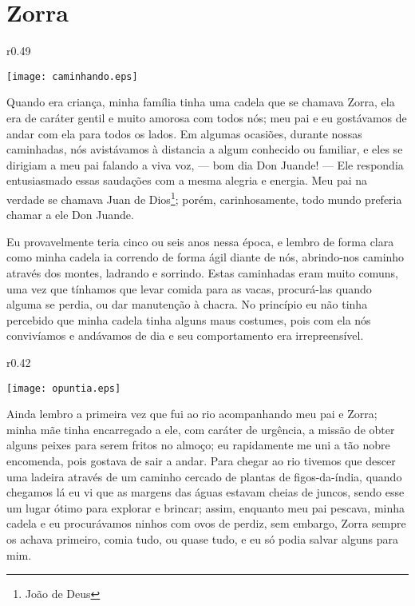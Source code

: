 \cleardoublepage
\newpage
{}
\chapter{Zorra}


\begin{wrapfigure}{r}{0.49\textwidth}
  \begin{center}
  \vspace{-30pt}
    \texttt{[image: caminhando.eps]}
  \end{center}
  \vspace{-20pt}
\end{wrapfigure}
Quando era criança, minha família tinha uma cadela que se chamava Zorra, ela era de caráter gentil e muito amorosa com todos nós; meu pai e eu gostávamos de andar com ela para todos os lados. Em algumas ocasiões, durante nossas caminhadas, nós avistávamos à distancia a algum conhecido ou familiar, e eles se dirigiam a meu pai falando a viva voz, --- bom dia Don Juande! --- Ele respondia entusiasmado essas saudações com a mesma alegria e energia.
Meu pai na verdade se chamava Juan de Dios\footnote{João de Deus}; porém, carinhosamente, todo mundo preferia chamar a ele Don Juande.


Eu provavelmente teria cinco ou seis anos nessa época, e lembro de forma clara como minha cadela ia correndo de forma ágil diante de nós, abrindo-nos caminho através dos montes, ladrando e sorrindo.
Estas caminhadas eram muito comuns, uma vez que tínhamos que levar comida para as vacas, procurá-las quando alguma se perdia, ou dar manutenção à chacra.
No princípio eu não tinha percebido que minha cadela tinha alguns maus costumes, pois com ela nós convivíamos e andávamos de dia e seu comportamento era irrepreensível. 

\begin{wrapfigure}{r}{0.42\textwidth}
  \begin{center}
  \vspace{-30pt}
    \texttt{[image: opuntia.eps]}
  \end{center}
  \vspace{-20pt}
\end{wrapfigure}
Ainda lembro a primeira vez que fui ao rio acompanhando meu pai e Zorra; minha mãe tinha encarregado a ele, com caráter de urgência, a missão de obter alguns peixes para serem fritos no almoço; eu rapidamente me uni a tão nobre encomenda, pois gostava de sair a andar. 
Para chegar ao rio tivemos que descer uma ladeira através de um caminho cercado de plantas de figos-da-índia, quando chegamos lá eu vi que as margens das águas estavam cheias de juncos, sendo esse um lugar ótimo para explorar e brincar; assim, enquanto meu pai pescava, minha cadela e eu procurávamos ninhos com ovos de perdiz, sem embargo, Zorra sempre os achava primeiro, comia tudo, ou quase tudo, e eu só podia salvar alguns para mim.


